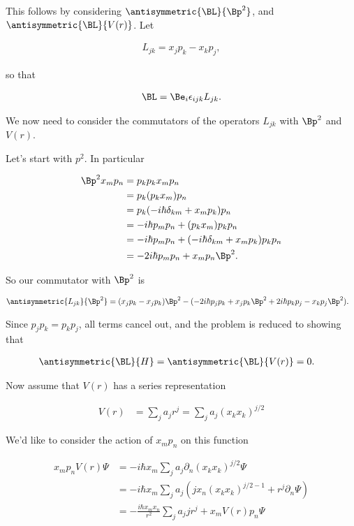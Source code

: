 This follows by considering $\antisymmetric{\BL}{\Bp^2}$, and $\antisymmetric{\BL}{V(r)}$.  Let

\begin{align}\label{eqn:desaiCh3:1100}
L_{jk} = x_j p_k - x_k p_j,
\end{align}

so that 

\begin{align}\label{eqn:desaiCh3:1101}
\BL = \Be_i \epsilon_{ijk} L_{jk}.
\end{align}

We now need to consider the commutators of the operators $L_{jk}$ with $\Bp^2$ and $V(r)$.

Let's start with $p^2$.  In particular

\begin{align*}
\Bp^2 x_m p_n
&=
p_k p_k x_m p_n \\
&=
p_k (p_k x_m) p_n \\
&=
p_k (-i\hbar \delta_{km} + x_m p_k) p_n \\
&=
-i\hbar p_m p_n + (p_k x_m) p_k p_n \\
&=
-i\hbar p_m p_n + (-i \hbar \delta_{km} + x_m p_k ) p_k p_n \\
&=
-2 i\hbar p_m p_n + x_m p_n \Bp^2.
\end{align*}

So our commutator with $\Bp^2$ is

\begin{align*}
\antisymmetric{L_{jk}}{\Bp^2}
&=
(x_j p_k - x_j p_k) \Bp^2 
-( -2 i\hbar p_j p_k + x_j p_k \Bp^2 +2 i\hbar p_k p_j - x_k p_j \Bp^2 ).
\end{align*}

Since $p_j p_k = p_k p_j$, all terms cancel out, and the problem is reduced to showing that 

\begin{align*}
\antisymmetric{\BL}{H} &= \antisymmetric{\BL}{V(r)} = 0.
\end{align*}

Now assume that $V(r)$ has a series representation

\begin{align*}
V(r) &= \sum_j a_j r^j = \sum_j a_j (x_k x_k)^{j/2}
\end{align*}

We'd like to consider the action of $x_m p_n$ on this function

\begin{align*}
x_m p_n V(r) \Psi
&= -i \hbar x_m \sum_j a_j \partial_n (x_k x_k)^{j/2} \Psi \\
&= -i \hbar x_m \sum_j a_j (j x_n (x_k x_k)^{j/2-1} + r^j \partial_n \Psi) \\
&= -\frac{i \hbar x_m x_n}{r^2} \sum_j a_j j r^j + 
x_m V(r) p_n \Psi
\end{align*}

